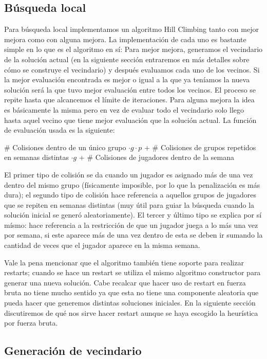 \documentclass[letter, 10pt]{article}
\begin{document}
\subsection{Búsqueda local}

Para búsqueda local implementamos un algoritmo Hill Climbing tanto con mejor mejora como con alguna mejora. La implementación de cada uno es bastante simple en lo que es el algoritmo en sí: Para mejor mejora, generamos el vecindario de la solución actual (en la siguiente sección entraremos en más detalles sobre cómo se construye el vecindario) y después evaluamos cada uno de los vecinos. Si la mejor evaluación encontrada es mejor o igual a la que ya teníamos la nueva solución será la que tuvo mejor evaluación entre todos los vecinos. El proceso se repite hasta que alcancemos el límite de iteraciones. Para alguna mejora la idea es básicamente la misma pero en vez de evaluar todo el vecindario solo llego hasta aquel vecino que tiene mejor evaluación que la solución actual. 
La función de evaluación usada es la siguiente:
\begin{center}
    \# Colisiones dentro de un único grupo $\cdot g \cdot p$ + \# Colisiones de grupos repetidos en semanas distintas $\cdot g$ + \# Colisiones de jugadores dentro de la semana  
\end{center}

El primer tipo de colisión se da cuando un jugador es asignado más de una vez dentro del mismo grupo (físicamente imposible, por lo que la penalización es más dura); el segundo tipo de colisión hace referencia a aquellos grupos de jugadores que se repiten en semanas distintas (muy útil para guiar la búsqueda cuando la solución inicial se generó aleatoriamente). El tercer y último tipo se explica por sí mísmo: hace referencia a la restricción de que un jugador juega a lo más una vez por semana, si este aparece más de una vez dentro de esta se deben ir sumando la cantidad de veces que el jugador aparece en la misma semana. 

Vale la pena mencionar que el algoritmo también tiene soporte para realizar restarts; cuando se hace un restart se utiliza el mismo algoritmo constructor para generar una nueva solución. Cabe recalcar que hacer uso de restart en fuerza bruta no tiene mucho sentido ya que esta no tiene una componente aleatoria que pueda hacer que generemos distintas soluciones iniciales. En la siguiente sección discutiremos de qué nos sirve hacer restart aunque se haya escogido la heurística por fuerza bruta.

\subsection{Generación de vecindario}
\end{document}
